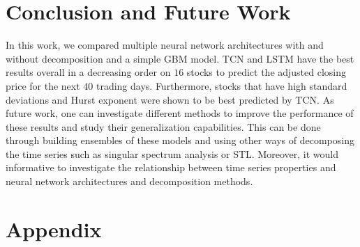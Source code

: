 \documentclass[12pt, A4]{article}
\begin{document}
\section{Conclusion and Future Work}
In this work, we compared multiple neural network architectures with and without decomposition and a simple GBM model. TCN and LSTM have the best results overall in a decreasing order on $16$ stocks to predict the adjusted closing price for the next $40$ trading days. Furthermore, stocks that have high standard deviations and Hurst exponent were shown to be best predicted by TCN. As future work, one can investigate different methods to improve the performance of these results and study their generalization capabilities. This can be done through building ensembles of these models and using other ways of decomposing the time series such as singular spectrum analysis or STL.  Moreover, it would informative to investigate the relationship between time series properties and neural network architectures and decomposition methods.




\clearpage

\section{Appendix}
\end{document}
